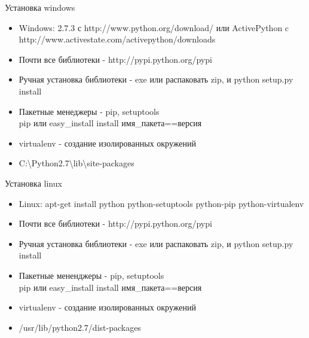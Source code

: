 \documentclass{article}
\begin{document}
\begin{center} Установка windows \end{center}
\begin{itemize}
    \item Windows: 2.7.3 с http://www.python.org/download/ 
    или ActivePython c http://www.activestate.com/activepython/downloads
    \item Почти все библиотеки - http://pypi.python.org/pypi
    \item Ручная установка библиотеки - exe или распаковать zip, и python setup.py install
    \item Пакетные менеджеры - pip, setuptools \\
    	pip или easy\_install install имя\_пакета==версия
    \item virtualenv - создание изолированных окружений
    \item C:{\textbackslash}Python2.7{\textbackslash}lib{\textbackslash}site-packages
\end{itemize}
\newpage

\begin{center} Установка linux \end{center}
\begin{itemize}
    \item Linux: apt-get install python python-setuptools python-pip python-virtualenv
    \item Почти все библиотеки - http://pypi.python.org/pypi
    \item Ручная установка библиотеки - exe или распаковать zip, и python setup.py install
    \item Пакетные мененджеры - pip, setuptools \\
        pip или easy\_install install имя\_пакета==версия
    \item virtualenv - создание изолированных окружений
    \item /usr/lib/python2.7/dist-packages
\end{itemize}
\newpage

\end{document}
